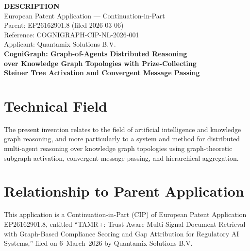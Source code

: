 \documentclass[a4paper,12pt]{article}
\begin{document}
\begin{center}
{\large\bfseries DESCRIPTION}\\[3mm]
{\normalsize European Patent Application --- Continuation-in-Part}\\[1mm]
{\normalsize Parent: EP26162901.8 (filed 2026-03-06)}\\[1mm]
{\normalsize Reference: COGNIGRAPH-CIP-NL-2026-001}\\[1mm]
{\normalsize Applicant: Quantamix Solutions B.V.}\\[3mm]
{\large\bfseries CogniGraph: Graph-of-Agents Distributed Reasoning\\[2mm]
over Knowledge Graph Topologies with Prize-Collecting\\[2mm]
Steiner Tree Activation and Convergent Message Passing}
\end{center}

\vspace{8mm}


\section*{Technical Field}

\noindent The present invention relates to the field of artificial intelligence and knowledge graph reasoning, and more particularly to a system and method for distributed multi-agent reasoning over knowledge graph topologies using graph-theoretic subgraph activation, convergent message passing, and hierarchical aggregation.

\vspace{4mm}


\section*{Relationship to Parent Application}

\noindent This application is a Continuation-in-Part (CIP) of European Patent Application EP26162901.8, entitled ``TAMR+: Trust-Aware Multi-Signal Document Retrieval with Graph-Based Compliance Scoring and Gap Attribution for Regulatory AI Systems,'' filed on 6~March~2026 by Quantamix Solutions B.V.
\end{document}

